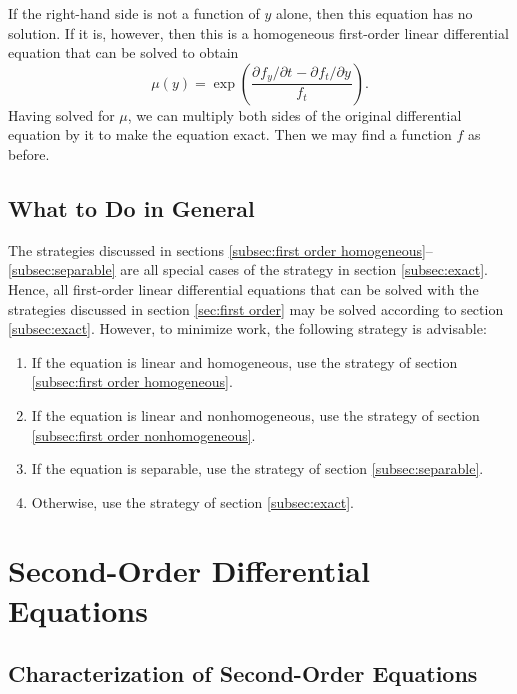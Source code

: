 \documentclass{myart}
\newcommand{\fpderiv}[3][]{\partial^{#1}#2/\partial#3^{#1}}
\begin{document}
If the right-hand side is not a function of $y$ alone, then this
equation has no solution. If it is, however, then this is a
homogeneous first-order linear differential equation that can be
solved to obtain
\begin{equation*}
  \mu(y) = \exp\left(\frac{\fpderiv{f_y}{t}
         - \fpderiv{f_t}{y}}{f_t}\right).
\end{equation*}
Having solved for $\mu$, we can multiply both sides of the original
differential equation by it to make the equation exact. Then we may
find a function $f$ as before.

\subsection{What to Do in General}
\label{subsec:first order strategy}

The strategies discussed in sections \ref{subsec:first order
  homogeneous}--\ref{subsec:separable} are all special cases of the
strategy in section \ref{subsec:exact}. Hence, all first-order linear
differential equations that can be solved with the strategies
discussed in section \ref{sec:first order} may be solved according to
section \ref{subsec:exact}. However, to minimize work, the following
strategy is advisable:
\begin{enumerate}
\item If the equation is linear and homogeneous, use the strategy of
  section \ref{subsec:first order homogeneous}.
\item If the equation is linear and nonhomogeneous, use the strategy
  of section \ref{subsec:first order nonhomogeneous}.
\item If the equation is separable, use the strategy of section
  \ref{subsec:separable}.
\item Otherwise, use the strategy of section \ref{subsec:exact}.
\end{enumerate}

\section{Second-Order Differential Equations}
\label{sec:second order}

\subsection{Characterization of Second-Order Equations}
\label{subsec:second order characterization}
\end{document}
